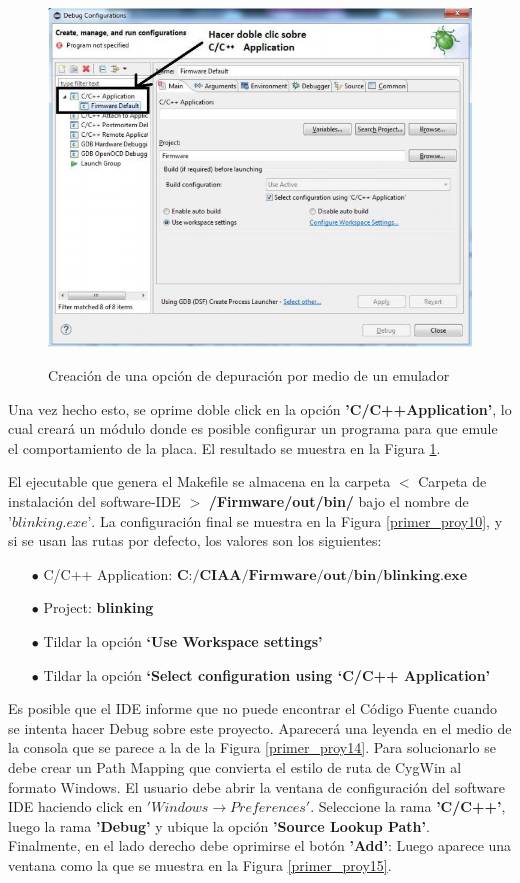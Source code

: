 \documentclass[12pt,letterpaper]{article}
\begin{document}
\begin{center}
\begin{figure}[!h]
\centering
\includegraphics[width=8 cm]{figuras/primer_proy12.png}\\
\caption{Creación de una opción de depuración por medio de un emulador}
\label{primer_proy12}
\end{figure}
\end{center}


Una vez hecho esto, se oprime doble click en la opción \textbf{'C/C++Application'}, lo cual  creará un módulo donde es posible configurar un programa para que emule el comportamiento de la placa.
El resultado se muestra en la Figura \ref{primer_proy12}.

El ejecutable que genera el Makefile se almacena en la carpeta $<$ Carpeta de instalación del software-IDE $>$ \textbf{/Firmware/out/bin/} bajo el nombre de $\textit{'blinking.exe'}$. La configuración final se muestra en la Figura \ref{primer_proy10}, y si se usan las rutas por defecto, los valores son los siguientes:

\begin{enumerate}
\item[$\bullet$]C/C++ Application: $\textbf{C:/CIAA/Firmware/out/bin/blinking.exe}$
\item[$\bullet$]Project: \textbf{blinking}
\item[$\bullet$]Tildar la opción \textbf{‘Use Workspace settings’}
\item[$\bullet$]Tildar la opción \textbf{‘Select configuration using ‘C/C++ Application’}
\end{enumerate}

Es posible que el IDE informe que no puede encontrar el Código Fuente cuando se intenta hacer Debug sobre este proyecto. Aparecerá una leyenda en el medio de la consola que se parece
a la de la Figura \ref{primer_proy14}. Para solucionarlo se debe crear un Path Mapping que convierta el estilo de ruta de CygWin al formato Windows. El usuario debe abrir la ventana de configuración del software IDE
haciendo click en $'Windows \longrightarrow Preferences'$. Seleccione la rama \textbf{'C/C++'}, luego la rama \textbf{'Debug'} y ubique la opción \textbf{'Source Lookup Path'}.\\
Finalmente, en el lado derecho debe oprimirse el botón \textbf{'Add'}: Luego aparece una ventana como la que se muestra en la Figura \ref{primer_proy15}.
\end{document}
